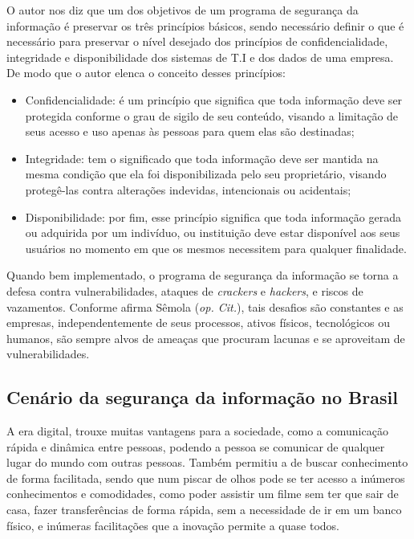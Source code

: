 \documentclass[
	12pt,				%
	openright,			%
	oneside,			%
	a4paper,			%
	english,			%
	french,				%
	spanish,			%
	brazil,				%
	]{abntex2}
\begin{document}
O autor  nos diz que um dos objetivos de um programa de segurança da informação é preservar os três princípios básicos, sendo necessário definir o que é necessário para preservar o nível desejado dos princípios de confidencialidade, integridade e disponibilidade dos sistemas de T.I e dos dados de uma empresa. De modo que o autor  elenca o conceito desses princípios:

\begin{itemize}
\item Confidencialidade: é um princípio que significa que toda informação deve ser protegida conforme o grau de sigilo de seu conteúdo, visando a limitação de seus acesso e uso apenas às pessoas para quem elas são destinadas;
\item Integridade: tem o significado que toda informação deve ser mantida na mesma condição que ela foi disponibilizada pelo seu proprietário, visando protegê-las contra alterações indevidas, intencionais ou acidentais;
\item Disponibilidade: por fim, esse princípio significa que toda informação gerada ou adquirida por um indivíduo, ou instituição deve estar disponível aos seus usuários no momento em que os mesmos necessitem para qualquer finalidade.
\end{itemize}

Quando bem implementado, o programa de segurança da informação se torna a defesa contra vulnerabilidades, ataques de \textit{crackers} e \textit{hackers}, e riscos de vazamentos. Conforme afirma Sêmola (\textit{op. Cit.}), tais desafios são constantes e as empresas, independentemente de seus processos, ativos físicos, tecnológicos ou humanos, são sempre alvos de ameaças que procuram lacunas e se aproveitam de vulnerabilidades.


\subsection{Cenário da segurança da informação no Brasil}

A era digital, trouxe muitas vantagens para a sociedade, como a comunicação rápida e dinâmica entre pessoas, podendo a pessoa se comunicar de qualquer lugar do mundo com outras pessoas. Também permitiu a de buscar conhecimento de forma facilitada, sendo que num piscar de olhos pode se ter acesso a inúmeros conhecimentos e comodidades, como poder assistir um filme sem ter que sair de casa, fazer transferências de forma rápida, sem a necessidade de ir em um banco físico, e inúmeras facilitações que a inovação permite a quase todos.
\end{document}

